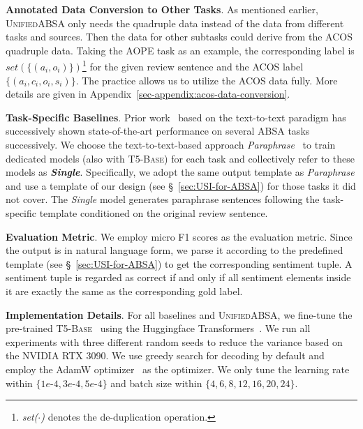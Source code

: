 \documentclass[11pt]{article}
\newcommand{\UnifiedABSA}{\textsc{UnifiedABSA}\xspace}
\newcommand{\single}{\textit{Single}\xspace}
\begin{document}
\noindent\textbf{Annotated Data Conversion to Other Tasks}. As mentioned earlier, \UnifiedABSA only needs the quadruple data instead of the data from different tasks and sources. Then the data for other subtasks could derive from the ACOS quadruple data. Taking the AOPE task as an example, the corresponding label is $set\left( \{\left(a_i,o_i\right) \} \right)$\footnote{\emph{set($\cdot$)} denotes the de-duplication operation.} for the given review sentence and the ACOS label $\{\left(a_i, c_i, o_i, s_i\right)\}$. The practice allows us to utilize the ACOS data fully. More details are given in Appendix~\ref{sec-appendix:acos-data-conversion}.



\noindent\textbf{Task-Specific Baselines}. Prior work~\cite{zhang-etal-2021-gas,zhang-etal-2021-paraphrase} based on the text-to-text paradigm has successively shown state-of-the-art performance on several ABSA tasks successively. We choose the text-to-text-based approach \emph{Paraphrase}~\cite{zhang-etal-2021-paraphrase} to train dedicated models (also with \textsc{T5-Base}) for each task and  collectively refer to these models as \textbf{\single}. Specifically, we adopt the same output template as \emph{Paraphrase} and use a template of our design (see \S~\ref{sec:USI-for-ABSA}) for those tasks it did not cover. The \single model generates paraphrase sentences following the task-specific template conditioned on the original review sentence.



\noindent\textbf{Evaluation Metric}. We employ micro F1 scores as the evaluation metric. Since the output is in natural language form, we parse it according to the predefined template (see \S~\ref{sec:USI-for-ABSA}) to get the corresponding sentiment tuple. A sentiment tuple is regarded as correct if and only if all sentiment elements inside it are exactly the same as the corresponding gold label. 



\noindent\textbf{Implementation Details}. For all baselines and \UnifiedABSA, we fine-tune the pre-trained \textsc{T5-Base}~\citep{raffel2020t5} using the Huggingface Transformers~\citep{wolf-etal-2020-transformers}. We run all experiments with three different random seeds to reduce the variance based on the NVIDIA RTX 3090. We use greedy search for decoding by default and employ the AdamW optimizer~\citep{DBLP:conf/iclr/LoshchilovH19} as the optimizer. We only tune the learning rate within $\{1e$-$4$$, 3e$-$4$$, 5e$-$4\}$ and batch size within $\{4,6,8,12,16,20,24\}$. 
\end{document}
